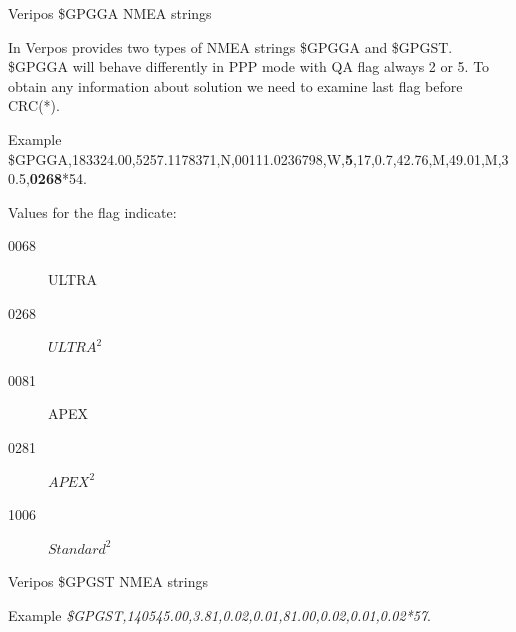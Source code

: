 \documentclass[11pt]{beamer}
\begin{document}
\begin{frame}{Veripos \$GPGGA NMEA strings}
	
	In Verpos provides two types of NMEA strings \$GPGGA and \$GPGST. \$GPGGA will behave differently in PPP mode with QA flag always 2 or 5. To obtain any information about solution we need to examine last flag before CRC(*).\\
	
	
	\begin{exampleblock}{Example}
		{\tiny{\$GPGGA,183324.00,5257.1178371,N,00111.0236798,W,\textbf{5},17,0.7,42.76,M,49.01,M,30.5,{\color{red}\textbf{0268}}*54}.}
	\end{exampleblock}
	
	Values for the flag indicate:	
	\begin{description}
		\item [0068]	ULTRA
		\item [0268]	$ULTRA^2$
		\item [0081]	APEX
		\item [0281]	$APEX^2$
		\item [1006]	$Standard^2$
	\end{description}
\end{frame}

\begin{frame}[plain]{Veripos \$GPGST NMEA strings}

	\begin{exampleblock}{Example}
		{\textit{\$GPGST,140545.00,3.81,0.02,0.01,81.00,0.02,0.01,0.02*57}.}
	\end{exampleblock}
	\vspace*{-1cm}
	\begin{table}
		\centering
		\begin{minipage}[t]{\textheight}%
		\end{minipage}
	\end{table}
\end{frame}
\end{document}
